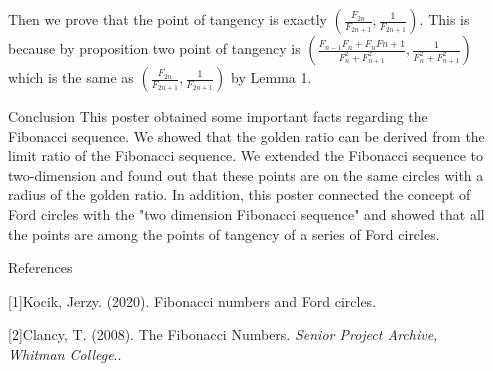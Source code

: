\documentclass[final]{beamer}
\newlength{\sepwidth}
\newlength{\colwidth}
\newcommand{\separatorcolumn}{\begin{column}{\sepwidth}\end{column}}
\begin{document}
\begin{frame}[t]
\begin{columns}[t]
\begin{column}{\colwidth}
  
  Then we prove that the point of tangency is exactly $(\frac{F_{2n}}{F_{2n+1}},\frac{1}{F_{2n+1}})$.    This is because by proposition two point of tangency is $(\frac{F_{n-1}F_{n}+F_{n}F{n+1}}{F_{n}^2+F_{n+1}^2},\frac{1}{F_{n}^2+F_{n+1}^2})$  which is the same as $(\frac{F_{2n}}{F_{2n+1}},\frac{1}{F_{2n+1}})$ by Lemma 1.
  \begin{block}{Conclusion}
This poster obtained some important facts regarding the Fibonacci sequence. We showed that the golden ratio can be derived from the limit ratio of the Fibonacci sequence. We extended the Fibonacci sequence to two-dimension and found out that these points are on the same circles with a radius of the golden ratio. In addition, this poster connected the concept of Ford circles with the "two dimension Fibonacci sequence" and showed that all the points are among the points of tangency of a series of Ford circles. 
    



  \end{block}

  \begin{block}{References}

    \nocite{*}
    \footnotesize{[1]Kocik, Jerzy. (2020). Fibonacci numbers and Ford circles. }
    
    \footnotesize{[2]Clancy, T. (2008). The Fibonacci Numbers. \textit{Senior Project Archive, Whitman College}.. }

  \end{block}

\end{column}

\separatorcolumn
\end{columns}
\end{frame}
\end{document}
